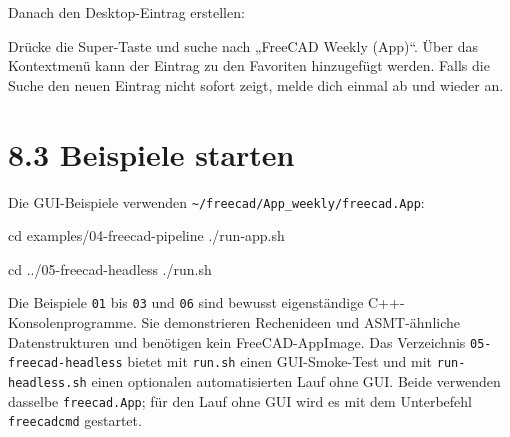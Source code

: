 \documentclass[
  12pt
]{book}
\newenvironment{Shaded}{}{}
\newcommand{\BuiltInTok}[1]{\textcolor[rgb]{0.00,0.50,0.00}{#1}}
\newcommand{\ExtensionTok}[1]{#1}
\newcommand{\FunctionTok}[1]{\textcolor[rgb]{0.02,0.16,0.49}{#1}}
\newcommand{\NormalTok}[1]{#1}
\newcommand{\OperatorTok}[1]{\textcolor[rgb]{0.40,0.40,0.40}{#1}}
\newcommand{\StringTok}[1]{\textcolor[rgb]{0.25,0.44,0.63}{#1}}
\newcommand{\VariableTok}[1]{\textcolor[rgb]{0.10,0.09,0.49}{#1}}
\begin{document}
Danach den Desktop-Eintrag erstellen:

\begin{Shaded}
\end{Shaded}

Drücke die Super-Taste und suche nach „FreeCAD Weekly (App)``. Über das
Kontextmenü kann der Eintrag zu den Favoriten hinzugefügt werden. Falls
die Suche den neuen Eintrag nicht sofort zeigt, melde dich einmal ab und
wieder an.

\hypertarget{beispiele-starten}{%
\section{\texorpdfstring{{8.3} Beispiele
starten}{8.3 Beispiele starten}}\label{beispiele-starten}}

Die GUI-Beispiele verwenden
\texttt{\textasciitilde{}/freecad/App\_weekly/freecad.App}:

\begin{Shaded}
\begin{Highlighting}[]
\BuiltInTok{cd}\NormalTok{ examples/04{-}freecad{-}pipeline}
\ExtensionTok{./run{-}app.sh}

\BuiltInTok{cd}\NormalTok{ ../05{-}freecad{-}headless}
\ExtensionTok{./run.sh}
\end{Highlighting}
\end{Shaded}

Die Beispiele \texttt{01} bis \texttt{03} und \texttt{06} sind bewusst
eigenständige C++-Konsolenprogramme. Sie demonstrieren Rechenideen und
ASMT-ähnliche Datenstrukturen und benötigen kein FreeCAD-AppImage. Das
Verzeichnis \texttt{05-freecad-headless} bietet mit \texttt{run.sh}
einen GUI-Smoke-Test und mit \texttt{run-headless.sh} einen optionalen
automatisierten Lauf ohne GUI. Beide verwenden dasselbe
\texttt{freecad.App}; für den Lauf ohne GUI wird es mit dem Unterbefehl
\texttt{freecadcmd} gestartet.
\end{document}
